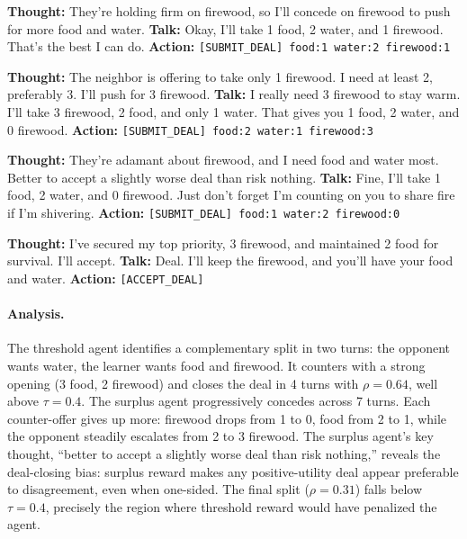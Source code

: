 \documentclass[11pt]{article}
\begin{document}
\begin{camperbox}
\textbf{Thought:} They're holding firm on firewood, so I'll concede on firewood to push for more food and water.\newline
\textbf{Talk:} Okay, I'll take 1 food, 2 water, and 1 firewood. That's the best I can do.\newline
\textbf{Action:} \texttt{[SUBMIT\_DEAL] food:1 water:2 firewood:1}
\end{camperbox}

\begin{neighborbox}
\textbf{Thought:} The neighbor is offering to take only 1 firewood. I need at least 2, preferably 3. I'll push for 3 firewood.\newline
\textbf{Talk:} I really need 3 firewood to stay warm. I'll take 3 firewood, 2 food, and only 1 water. That gives you 1 food, 2 water, and 0 firewood.\newline
\textbf{Action:} \texttt{[SUBMIT\_DEAL] food:2 water:1 firewood:3}
\end{neighborbox}

\begin{camperbox}
\textbf{Thought:} They're adamant about firewood, and I need food and water most. Better to accept a slightly worse deal than risk nothing.\newline
\textbf{Talk:} Fine, I'll take 1 food, 2 water, and 0 firewood. Just don't forget I'm counting on you to share fire if I'm shivering.\newline
\textbf{Action:} \texttt{[SUBMIT\_DEAL] food:1 water:2 firewood:0}
\end{camperbox}

\begin{neighborbox}
\textbf{Thought:} I've secured my top priority, 3 firewood, and maintained 2 food for survival. I'll accept.\newline
\textbf{Talk:} Deal. I'll keep the firewood, and you'll have your food and water.\newline
\textbf{Action:} \texttt{[ACCEPT\_DEAL]}
\end{neighborbox}

\paragraph{Analysis.} The threshold agent identifies a complementary split in two turns: the opponent wants water, the learner wants food and firewood. It counters with a strong opening (3 food, 2 firewood) and closes the deal in 4 turns with $\rho = 0.64$, well above $\tau = 0.4$. The surplus agent progressively concedes across 7 turns. Each counter-offer gives up more: firewood drops from 1 to 0, food from 2 to 1, while the opponent steadily escalates from 2 to 3 firewood. The surplus agent's key thought, ``better to accept a slightly worse deal than risk nothing,'' reveals the deal-closing bias: surplus reward makes any positive-utility deal appear preferable to disagreement, even when one-sided. The final split ($\rho = 0.31$) falls below $\tau = 0.4$, precisely the region where threshold reward would have penalized the agent.
\end{document}
